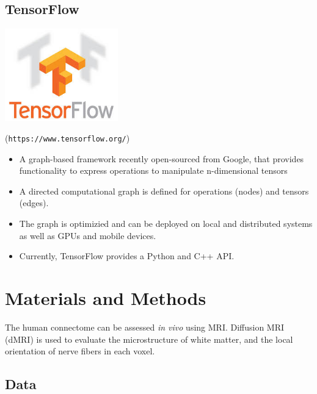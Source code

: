 \documentclass[a0,landscape]{a0poster}
\begin{document}
\begin{multicols}{3}
\begin{minipage}[b]{0.75\linewidth}
  \subsection*{TensorFlow}
\end{minipage}
\begin{minipage}[b]{0.25\linewidth}
  \includegraphics[height=4cm]{tensor-flow-logo.png}
\end{minipage}

(\texttt{https://www.tensorflow.org/})
\begin{itemize}

\item A graph-based framework recently open-sourced from Google, that provides functionality to express operations to manipulate n-dimensional tensors

\item A directed computational graph is defined for operations (nodes) and tensors (edges).

\item The graph is optimizied and can be deployed on local and distributed systems as well as GPUs and mobile devices.

\item Currently, TensorFlow provides a Python and C++ API.

\end{itemize}

\normalsize
\section*{Materials and Methods}
The human connectome can be assessed \emph{in vivo} using MRI. Diffusion MRI
(dMRI) is used to evaluate the microstructure of white matter, and the local orientation of nerve fibers in each voxel.

\subsection*{Data}


\end{multicols}
\end{document}
